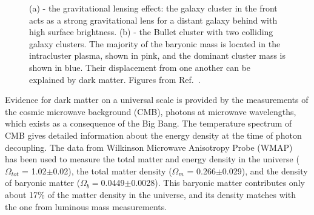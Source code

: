 \begin{figure}[!h]
\centering
{}
\caption[The gravitational lensing effect and the Bullet cluster with two colliding galaxy clusters]{(a) - the gravitational lensing effect: the galaxy cluster in the front acts as a strong gravitational lens for a distant galaxy behind with high surface brightness.  (b) - the Bullet cluster with two colliding galaxy clusters. The majority of the baryonic mass is located in the intracluster plasma, shown in pink, and the dominant cluster mass is shown in blue. Their displacement from one another can be explained by dark matter. Figures from Ref.~\cite{NASA}.}
\label{figGravitationalLensing}
\end{figure}

Evidence for dark matter on a universal scale is provided by the measurements of the cosmic microwave background (CMB), photons at microwave wavelengths, which exists as a consequence of the Big Bang. The temperature spectrum of CMB gives detailed information about the energy density at the time of photon decoupling. The data from Wilkinson Microwave Anisotropy Probe (WMAP)~\cite{WMAP_5year, WMAP_7year} has been used to measure the total matter and energy density in the universe ($\Omega_{tot}$ = 1.02$\pm$0.02), the total matter density ($\Omega_{m}$ = 0.266$\pm$0.029), and the density of baryonic matter ($\Omega_{b} = $0.0449$\pm$0.0028). This baryonic matter contributes only about 17\% of the matter density in the universe, and its density matches with the one from luminous mass measurements.

